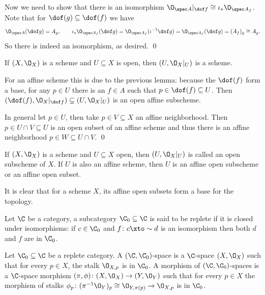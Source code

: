     Now we need to show that there is an isomorphism $\O_{\spec A}|_{\dof f}\cong\iota_*\O_{\spec A_f}$.
    Note that for $\dof(g)\subseteq\dof(f)$ we have
    $$ \O_{\spec A}(\dof g)=A_g,\qquad \iota_*\O_{\spec A_f}(\dof g)=\O_{\spec A_f}(\iota^{-1}\dof g)=\O_{\spec A_f}(\dof g) = (A_f)_g \cong A_g . $$
    So there is indeed an isomorphism, as desired.
    \qed

\eproof

\bcoro

    If $(X,\O_X)$ is a scheme and $U\subseteq X$ is open, then $(U,\O_X|_U)$ is a scheme.

\ecoro

\bproof

    For an affine scheme this is due to the previous lemma: because the $\dof(f)$ form a base, for any $p\in U$ there is an $f\in A$ such that $p\in\dof(f)\subseteq U$.
    Then $(\dof(f),\O_X|_{\dof f})\subseteq(U,\O_X|_U)$ is an open affine subscheme.

    In general let $p\in U$, then take $p\in V\subseteq X$ an affine neighborhood.
    Then $p\in U\cap V\subseteq U$ is an open subset of an affine scheme and thus there is an affine neighborhood $p\in W\subseteq U\cap V$.
    \qed

\eproof

\bdefn

    If $(X,\O_X)$ is a scheme and $U\subseteq X$ open, then $(U,\O_X|_U)$ is called an {\emphcolor open subscheme} of $X$.
    If $U$ is also an affine scheme, then $U$ is an {\emphcolor affine open subscheme} or an {\emphcolor affine open subset}.

\edefn

It is clear that for a scheme $X$, its affine open subsets form a base for the topology.

\bdefn

    Let $\C$ be a category, a subcategory $\C_0\subseteq\C$ is said to be {\emphcolor replete} if it is closed under isomorphisms: if $c\in\C_0$ and $f\colon c\xto\sim d$ is an isomorphism
    then both $d$ and $f$ are in $\C_0$.

    Let $\C_0\subseteq\C$ be a replete category.
    A $(\C,\C_0)$-space is a $\C$-space $(X,\O_X)$ such that for every $p\in X$, the stalk $\O_{X,p}$ is in $\C_0$.
    A morphism of $(\C,\C_0)$-spaces is a $\C$-space morphism $(\pi,\phi)\colon(X,\O_X)\to(Y,\O_Y)$ such that for every $p\in X$ the morphism of stalks $\phi_p\colon(\pi^{-1}\O_Y)_p\cong\O_{Y,\pi(p)}\to\O_{X,p}$
    is in $\C_0$.

